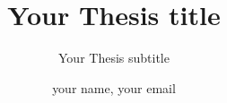 \documentclass{./llncs2e/llncs}
\begin{document}
\title{Your Thesis title}

\subtitle{Your Thesis subtitle}
\author{your name, your email}

\maketitle









\newpage
\appendix




%
%



\end{document}
